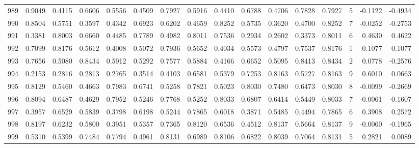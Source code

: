 \begin{tabular}{lrrrrrrrrrrrrrrr}
989 &      0.9049 &  0.4115 &  0.6606 &  0.5556 &  0.4509 &  0.7927 &  0.5916 &  0.4410 &  0.6788 &  0.4706 &   0.7828 &     0.7927 &      5 &                   -0.1122 &                    -0.4934 \\
990 &      0.8504 &  0.5751 &  0.3597 &  0.4342 &  0.6923 &  0.6202 &  0.4659 &  0.8252 &  0.5735 &  0.3620 &   0.4700 &     0.8252 &      7 &                   -0.0252 &                    -0.2753 \\
991 &      0.3381 &  0.8003 &  0.6660 &  0.4485 &  0.7789 &  0.4982 &  0.8011 &  0.7536 &  0.2934 &  0.2602 &   0.3373 &     0.8011 &      6 &                    0.4630 &                     0.4622 \\
992 &      0.7099 &  0.8176 &  0.5612 &  0.4008 &  0.5072 &  0.7936 &  0.5652 &  0.4034 &  0.5573 &  0.4797 &   0.7537 &     0.8176 &      1 &                    0.1077 &                     0.1077 \\
993 &      0.7656 &  0.5080 &  0.8434 &  0.5912 &  0.5292 &  0.7577 &  0.5884 &  0.4166 &  0.6652 &  0.5095 &   0.8413 &     0.8434 &      2 &                    0.0778 &                    -0.2576 \\
994 &      0.2153 &  0.2816 &  0.2813 &  0.2765 &  0.3514 &  0.4103 &  0.6581 &  0.5379 &  0.7253 &  0.8163 &   0.5727 &     0.8163 &      9 &                    0.6010 &                     0.0663 \\
995 &      0.8129 &  0.5460 &  0.4663 &  0.7983 &  0.6741 &  0.5258 &  0.7821 &  0.5023 &  0.8030 &  0.7480 &   0.6473 &     0.8030 &      8 &                   -0.0099 &                    -0.2669 \\
996 &      0.8094 &  0.6487 &  0.4629 &  0.7952 &  0.5246 &  0.7768 &  0.5252 &  0.8033 &  0.6807 &  0.6414 &   0.5449 &     0.8033 &      7 &                   -0.0061 &                    -0.1607 \\
997 &      0.3957 &  0.6529 &  0.5839 &  0.3798 &  0.6198 &  0.5244 &  0.7865 &  0.6018 &  0.3871 &  0.5485 &   0.4494 &     0.7865 &      6 &                    0.3908 &                     0.2572 \\
998 &      0.8197 &  0.6232 &  0.5800 &  0.3951 &  0.5357 &  0.7365 &  0.8120 &  0.6536 &  0.4512 &  0.8137 &   0.5664 &     0.8137 &      9 &                   -0.0060 &                    -0.1965 \\
999 &      0.5310 &  0.5399 &  0.7484 &  0.7794 &  0.4961 &  0.8131 &  0.6989 &  0.8106 &  0.6822 &  0.8039 &   0.7064 &     0.8131 &      5 &                    0.2821 &                     0.0089 \\
\bottomrule
\end{tabular}

